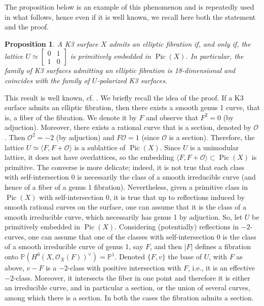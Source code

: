 \documentclass{amsart}
\newtheorem{proposition}[theorem]{Proposition}
\theoremstyle{definition}
\numberwithin{equation}{section}
\renewcommand{\O}{\mathcal{O}}
\DeclareMathOperator{\Pic}{Pic}
\begin{document}
The proposition below is an example of this phenomenon and is repeatedly used in what follows, hence even if it is well known, we recall here both the statement and the proof.

\begin{proposition}\label{prop: U-polarized}
    A K3 surface $X$ admits an elliptic fibration if, and only if, the lattice $U\simeq \left[\begin{array}{ll}0&1\\1&0\end{array}\right]$ is primitively embedded in $\Pic(X)$. In particular, the family of K3 surfaces admitting an elliptic fibration is 18-dimensional and coincides with the family of $U$-polarized  K3 surfaces.
\end{proposition}
\proof This result is well known, cf. \cite[Lemma 2.1]{Ko}. We briefly recall the idea of the proof. If a K3 surface admits an elliptic fibration, then there exists a smooth genus 1 curve, that is, a fiber of the fibration. We denote it by $F$ and observe that $F^2=0$ (by adjuction). Moreover, there exists a rational curve that is a section, denoted by $\mathcal{O}$. Then $\mathcal{O}^2=-2$ (by adjuction) and $F\mathcal{O}=1$ (since $\O$ is a section). Therefore, the lattice $U\simeq \langle F, F+\mathcal{O}\rangle$ is a sublattice of $\Pic(X)$. Since $U$ is a unimodular lattice, it does not have overlattices, so the embedding $\langle F,F+\mathcal{O}\rangle\subset \Pic(X)$ is primitive. The converse is more delicate; indeed, it is not true that each class with self-intersection 0 is necessarily the class of a smooth irreducible curve (and hence of a fiber of a genus 1 fibration). Nevertheless, given a primitive class in $\Pic(X)$ with self-intersection 0, it is true that up to reflections induced by smooth rational curves on the surface, one can assume that it is the class of a smooth irreducible curve, which necessarily has genus 1 by adjuction. So, let $U$ be primitively embedded in $\Pic(X)$. Considering (potentially) reflections in $-2$-curves, one can assume that one of the classes with self-intersection 0 is the class of a smooth irreducible curve of genus 1, say  $F$, and then $|F|$ defines a fibration onto $\mathbb{P}(H^0(X,\mathcal{O}_X(F))^{\vee})=\mathbb{P}^1$. Denoted $\{F, v\}$ the base of $U$, with $F$ as above, $v-F$ is a $-2$-class with positive intersection with $F$, i.e., it is an effective $-2$-class. Moreover, it intersects the fiber in one point and therefore it is either an irreducible curve, and in particular a section, or the union of several curves, among which there is a section. In both the cases the fibration admits a section.\endproof
\end{document}
